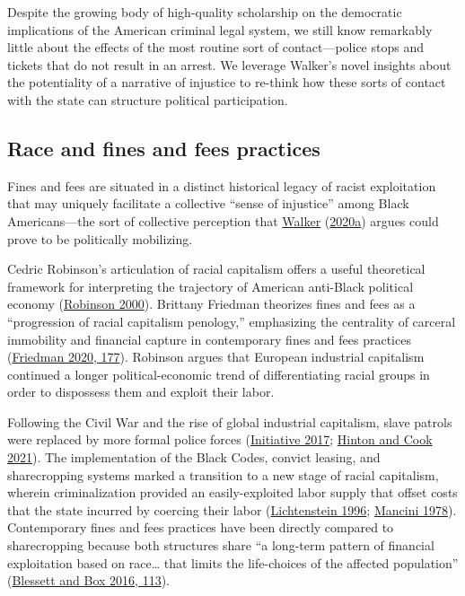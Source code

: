 \documentclass[
  12pt,
]{article}
\begin{document}
Despite the growing body of high-quality scholarship on the democratic implications of the American criminal legal system, we still know remarkably little about the effects of the most routine sort of contact---police stops and tickets that do not result in an arrest. We leverage Walker's novel insights about the potentiality of a narrative of injustice to re-think how these sorts of contact with the state can structure political participation.

\hypertarget{race-and-fines-and-fees-practices}{%
\subsection*{Race and fines and fees practices}\label{race-and-fines-and-fees-practices}}

Fines and fees are situated in a distinct historical legacy of racist exploitation that may uniquely facilitate a collective ``sense of injustice'' among Black Americans---the sort of collective perception that \protect\hyperlink{ref-Walker2020a}{Walker} (\protect\hyperlink{ref-Walker2020a}{2020a}) argues could prove to be politically mobilizing.

Cedric Robinson's articulation of racial capitalism offers a useful theoretical framework for interpreting the trajectory of American anti-Black political economy (\protect\hyperlink{ref-Robinson2000}{Robinson 2000}). Brittany Friedman theorizes fines and fees as a ``progression of racial capitalism penology,'' emphasizing the centrality of carceral immobility and financial capture in contemporary fines and fees practices (\protect\hyperlink{ref-Friedman2020}{Friedman 2020, 177}). Robinson argues that European industrial capitalism continued a longer political-economic trend of differentiating racial groups in order to dispossess them and exploit their labor.

Following the Civil War and the rise of global industrial capitalism, slave patrols were replaced by more formal police forces (\protect\hyperlink{ref-EqualJusticeInitiative2017}{Initiative 2017}; \protect\hyperlink{ref-Hinton2021}{Hinton and Cook 2021}). The implementation of the Black Codes, convict leasing, and sharecropping systems marked a transition to a new stage of racial capitalism, wherein criminalization provided an easily-exploited labor supply that offset costs that the state incurred by coercing their labor (\protect\hyperlink{ref-Lichtenstein1996}{Lichtenstein 1996}; \protect\hyperlink{ref-Mancini1978}{Mancini 1978}). Contemporary fines and fees practices have been directly compared to sharecropping because both structures share ``a long-term pattern of financial exploitation based on race\ldots{} that limits the life-choices of the affected population'' (\protect\hyperlink{ref-Blessett2016}{Blessett and Box 2016, 113}).
\end{document}
